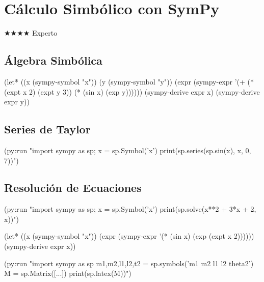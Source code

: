 \chapter{Cálculo Simbólico con SymPy}
\label{chap:symbolic-calculus}
{\huge$\bigstar$}{\huge$\bigstar$}{\huge$\bigstar$}{\huge$\bigstar$} Experto

\section{Álgebra Simbólica}
\begin{lispcode}
(let* ((x (sympy-symbol "x")) (y (sympy-symbol "y"))
       (expr (sympy-expr '(+ (* (expt x 2) (expt y 3)) (* (sin x) (exp y))))))
  (sympy-derive expr x)
  (sympy-derive expr y))
\end{lispcode}

\section{Series de Taylor}
\begin{lispcode}
(py:run "import sympy as sp; x = sp.Symbol('x')
print(sp.series(sp.sin(x), x, 0, 7))")
\end{lispcode}

\section{Resolución de Ecuaciones}
\begin{lispcode}
(py:run "import sympy as sp; x = sp.Symbol('x')
print(sp.solve(x**2 + 3*x + 2, x))")
\end{lispcode}

\begin{examplebox}[title=Derivada de sin(x)*exp(x\texttwosuperior)]
\begin{lispcode}
(let* ((x (sympy-symbol "x"))
       (expr (sympy-expr '(* (sin x) (exp (expt x 2))))))
  (sympy-derive expr x))
\end{lispcode}
\end{examplebox}

\begin{examplebox}[title=Matriz de masa de robot 2-DOF en LaTeX]
\begin{lispcode}
(py:run "import sympy as sp
m1,m2,l1,l2,t2 = sp.symbols('m1 m2 l1 l2 theta2')
M = sp.Matrix([...])
print(sp.latex(M))")
\end{lispcode}
\end{examplebox}

